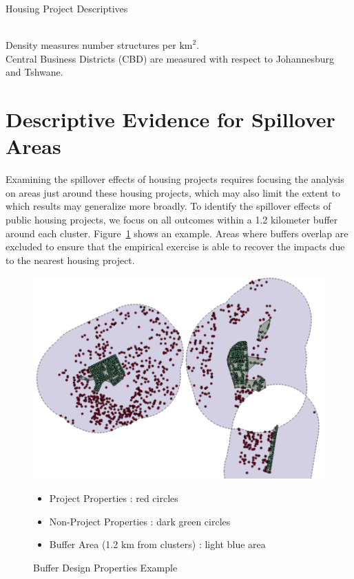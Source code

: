 \documentclass[12pt]{article}
\begin{document}
\begin{table}
	\centering
	\caption{Housing Project Descriptives}\label{table:projectdescriptives}
\\
Density measures number structures per $\text{km}^2$. \\  Central Business Districts (CBD) are measured with respect to Johannesburg and Tshwane.
\end{table}

\section{Descriptive Evidence for Spillover Areas}\label{section:descriptives}

Examining the spillover effects of housing projects requires focusing the analysis on areas just around these housing projects, which may also limit the extent to which results may generalize more broadly.  To identify the spillover effects of public housing projects, we focus on all outcomes within a 1.2 kilometer buffer around each cluster.  Figure~\ref{figure:bufferdesign} shows an example.  Areas where buffers overlap are excluded to ensure that the empirical exercise is able to recover the impacts due to the nearest housing project.  

\begin{figure}
\caption{Buffer Design Properties Example}\label{figure:bufferdesign}
\centering
\includegraphics[scale=.4]{figures/design.png} 
\begin{itemize}
\item Project Properties : red circles
\item Non-Project Properties : dark green circles
\item Buffer Area (1.2 km from clusters) : light blue area
\end{itemize}
\end{figure}
\end{document}
